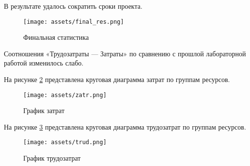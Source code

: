 
В результате удалось сократить сроки проекта.

\begin{figure}[H]
    \begin{center}
    \texttt{[image: assets/final\_res.png]}
    \caption{Финальная статистика}
    \label{fig:2}
    \end{center}
\end{figure}

Соотношения «Трудозатраты — Затраты» по сравнению с прошлой лабораторной работой изменилось слабо.

На рисунке \ref{fig:zatraty} представлена круговая диаграмма затрат по группам ресурсов.

\begin{figure}[H]
    \begin{center}
    \texttt{[image: assets/zatr.png]}
    \caption{График затрат}
    \label{fig:zatraty}
    \end{center}
\end{figure}

На рисунке \ref{fig:trud} представлена круговая диаграмма трудозатрат по группам ресурсов.

\begin{figure}[H]
    \begin{center}
    \texttt{[image: assets/trud.png]}
    \caption{График трудозатрат}
    \label{fig:trud}
    \end{center}
\end{figure}

